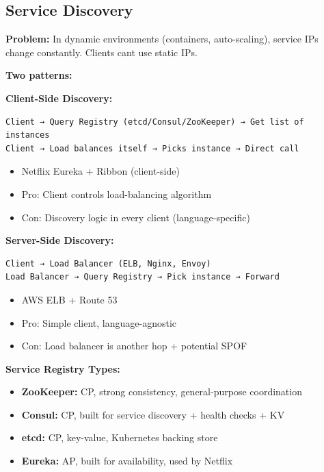 \documentclass[11pt]{article}
\providecommand{\tightlist}{\setlength{\itemsep}{1pt}\setlength{\parskip}{0pt}}
\begin{document}
\subsection{Service Discovery}\label{service-discovery}

\textbf{Problem:} In dynamic environments (containers, auto-scaling), service IPs change constantly. Clients can\textquotesingle t use static IPs.

\textbf{Two patterns:}

\textbf{Client-Side Discovery:}

\setcodelang{}

\begin{verbatim}
Client → Query Registry (etcd/Consul/ZooKeeper) → Get list of instances
Client → Load balances itself → Picks instance → Direct call
\end{verbatim}

\begin{itemize}
\tightlist
\item
  Netflix Eureka + Ribbon (client-side)
\item
  Pro: Client controls load-balancing algorithm
\item
  Con: Discovery logic in every client (language-specific)
\end{itemize}

\textbf{Server-Side Discovery:}

\setcodelang{}

\begin{verbatim}
Client → Load Balancer (ELB, Nginx, Envoy)
Load Balancer → Query Registry → Pick instance → Forward
\end{verbatim}

\begin{itemize}
\tightlist
\item
  AWS ELB + Route 53
\item
  Pro: Simple client, language-agnostic
\item
  Con: Load balancer is another hop + potential SPOF
\end{itemize}

\textbf{Service Registry Types:}

\begin{itemize}
\tightlist
\item
  \textbf{ZooKeeper:} CP, strong consistency, general-purpose coordination
\item
  \textbf{Consul:} CP, built for service discovery + health checks + KV
\item
  \textbf{etcd:} CP, key-value, Kubernetes backing store
\item
  \textbf{Eureka:} AP, built for availability, used by Netflix
\end{itemize}
\end{document}
